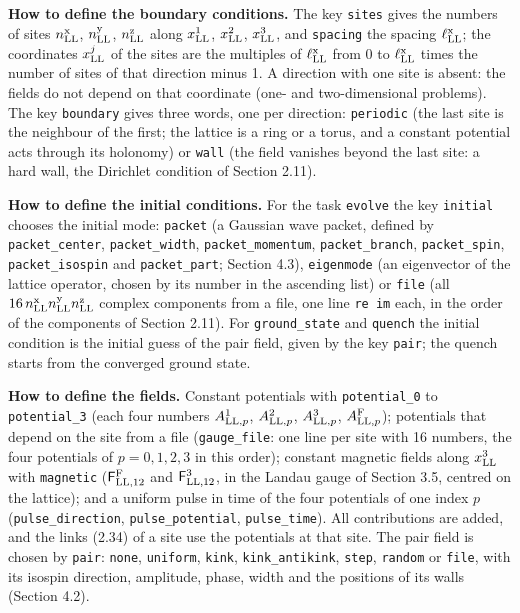 \documentclass[
  10pt,
]{article}
\begin{document}
\textbf{How to define the boundary conditions.} The key \texttt{sites}
gives the numbers of sites \(n^{\rm x}_{\rm LL}\),
\(n^{\rm y}_{\rm LL}\), \(n^{\rm z}_{\rm LL}\) along \(x^1_{\rm LL}\),
\(x^2_{\rm LL}\), \(x^3_{\rm LL}\), and \texttt{spacing} the spacing
\(\ell^{\rm x}_{\rm LL}\); the coordinates \(x^j_{\rm LL}\) of the sites
are the multiples of \(\ell^{\rm x}_{\rm LL}\) from 0 to
\(\ell^{\rm x}_{\rm LL}\) times the number of sites of that direction
minus 1. A direction with one site is absent: the fields do not depend
on that coordinate (one- and two-dimensional problems). The key
\texttt{boundary} gives three words, one per direction:
\texttt{periodic} (the last site is the neighbour of the first; the
lattice is a ring or a torus, and a constant potential acts through its
holonomy) or \texttt{wall} (the field vanishes beyond the last site: a
hard wall, the Dirichlet condition of Section 2.11).

\textbf{How to define the initial conditions.} For the task
\texttt{evolve} the key \texttt{initial} chooses the initial mode:
\texttt{packet} (a Gaussian wave packet, defined by
\texttt{packet\_center}, \texttt{packet\_width},
\texttt{packet\_momentum}, \texttt{packet\_branch},
\texttt{packet\_spin}, \texttt{packet\_isospin} and
\texttt{packet\_part}; Section 4.3), \texttt{eigenmode} (an eigenvector
of the lattice operator, chosen by its number in the ascending list) or
\texttt{file} (all
\(16\,n^{\rm x}_{\rm LL}n^{\rm y}_{\rm LL}n^{\rm z}_{\rm LL}\) complex
components from a file, one line \texttt{re\ im} each, in the order of
the components of Section 2.11). For \texttt{ground\_state} and
\texttt{quench} the initial condition is the initial guess of the pair
field, given by the key \texttt{pair}; the quench starts from the
converged ground state.

\textbf{How to define the fields.} Constant potentials with
\texttt{potential\_0} to \texttt{potential\_3} (each four numbers
\(A^1_{{\rm LL},p}\), \(A^2_{{\rm LL},p}\), \(A^3_{{\rm LL},p}\),
\(A^{\rm F}_{{\rm LL},p}\)); potentials that depend on the site from a
file (\texttt{gauge\_file}: one line per site with 16 numbers, the four
potentials of \(p=0,1,2,3\) in this order); constant magnetic fields
along \(x^3_{\rm LL}\) with \texttt{magnetic}
(\(\mathsf F^{\rm F}_{{\rm LL},12}\) and \(\mathsf F^3_{{\rm LL},12}\),
in the Landau gauge of Section 3.5, centred on the lattice); and a
uniform pulse in time of the four potentials of one index \(p\)
(\texttt{pulse\_direction}, \texttt{pulse\_potential},
\texttt{pulse\_time}). All contributions are added, and the links (2.34)
of a site use the potentials at that site. The pair field is chosen by
\texttt{pair}: \texttt{none}, \texttt{uniform}, \texttt{kink},
\texttt{kink\_antikink}, \texttt{step}, \texttt{random} or
\texttt{file}, with its isospin direction, amplitude, phase, width and
the positions of its walls (Section 4.2).
\end{document}

